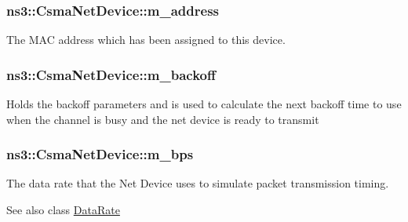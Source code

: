 \subsubsection[{\texorpdfstring{m\+\_\+address}{m_address}}]{ ns3\+::\+Csma\+Net\+Device\+::m\+\_\+address\hspace{0.3cm}{\ttfamily [private]}}\hypertarget{classns3_1_1CsmaNetDevice_ae26602a3eb4e97c0aa39ae61b4d028f8}{}\label{classns3_1_1CsmaNetDevice_ae26602a3eb4e97c0aa39ae61b4d028f8}
The M\+AC address which has been assigned to this device. 
\subsubsection[{\texorpdfstring{m\+\_\+backoff}{m_backoff}}]{ ns3\+::\+Csma\+Net\+Device\+::m\+\_\+backoff\hspace{0.3cm}{\ttfamily [private]}}\hypertarget{classns3_1_1CsmaNetDevice_a2cb5f9baf0a19a7ea6527002b0299403}{}\label{classns3_1_1CsmaNetDevice_a2cb5f9baf0a19a7ea6527002b0299403}
Holds the backoff parameters and is used to calculate the next backoff time to use when the channel is busy and the net device is ready to transmit 
\subsubsection[{\texorpdfstring{m\+\_\+bps}{m_bps}}]{ ns3\+::\+Csma\+Net\+Device\+::m\+\_\+bps\hspace{0.3cm}{\ttfamily [private]}}\hypertarget{classns3_1_1CsmaNetDevice_a3051c17d676b00f0b2e95291d16c3769}{}\label{classns3_1_1CsmaNetDevice_a3051c17d676b00f0b2e95291d16c3769}
The data rate that the Net Device uses to simulate packet transmission timing. \begin{DoxySeeAlso}{See also}
class \hyperlink{classns3_1_1DataRate}{Data\+Rate} 
\end{DoxySeeAlso}
